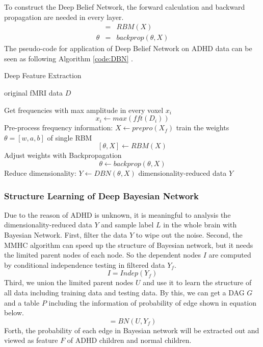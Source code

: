 \documentclass[10pt,twocolumn,letterpaper]{article}
\begin{document}
To construct the Deep Belief Network, the forward calculation and backward propagation are needed in every layer.
\begin{eqnarray}
[\theta,X] &=& RBM(X)   \\
\theta  &=& backprop(\theta,X)
\end{eqnarray}
The pseudo-code for application of Deep Belief Network on ADHD data can be seen as following Algorithm \ref{code:DBN} .
\begin{algorithm}[h]
\caption{Deep Feature Extraction}
\label{code:DBN}
\begin{algorithmic}[1]
\Require
original fMRI data $D$

\State Get frequencies with max amplitude in every voxel $x_i$
\[ x_i \gets max(fft(D_i))\]
\State Pre-process frequency information: $X \gets prepro(X_f)$ 
\State train the weights $\theta=[w,a,b]$ of single RBM
\[
[\theta,X]\gets RBM(X)
\]
\EndFor
\State Adjust weights with Backpropagation
\[
\theta \gets backprop(\theta,X)
\]
\State Reduce dimensionality:  $Y \gets DBN(\theta,X)$ 
\Ensure
dimensionality-reduced data $Y$
\end{algorithmic}
\end{algorithm}


\subsubsection{Structure Learning of Deep Bayesian Network}
Due to the reason of ADHD is unknown, it is meaningful to analysis the
dimensionality-reduced data $Y$ and sample label $L$ in the
whole brain with Bayesian Network. First, filter the data $Y$ to wipe out the noise. Second, the MMHC algorithm can speed up the structure of Bayesian network, but it needs the limited parent nodes of each node. So the dependent nodes $I$ are computed by conditional independence testing in filtered data $Y_f$.
\begin{equation}
I = Indep(Y_f)
\end{equation}
Third, we union the limited parent nodes $U$ and use it to learn the structure of all data including training data and testing data. By this, we can get a DAG $G$ and a table $P$ including the information of probability of edge shown in equation below.
\begin{equation}
[G,P] = BN(U,Y_f)
\end{equation}
Forth, the probability of each edge in Bayesian network will be extracted out and viewed as feature $F$ of ADHD children and normal children.
\end{document}
